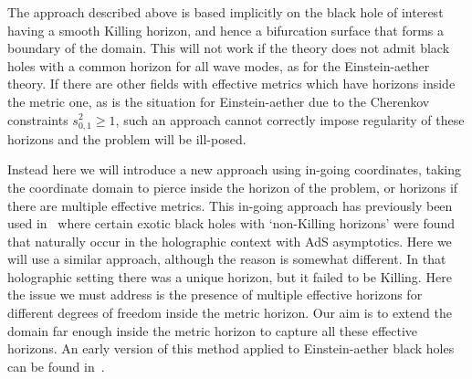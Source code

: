 \documentclass[12pt]{article}
\numberwithin{equation}{section}
\begin{document}
 The approach described above is based  implicitly on the black hole of interest having a smooth Killing horizon, and hence a bifurcation surface that forms a boundary of the domain.
This will not work if the theory does not admit black holes with a common horizon for all wave modes, as for the Einstein-aether theory. If there are other fields with effective metrics which have horizons inside the metric one, as is the situation for Einstein-aether due to the Cherenkov constraints $s_{0,1}^2 \ge 1$, such an approach cannot correctly impose regularity of these horizons and the problem will be ill-posed.

Instead here we will introduce a new approach using in-going coordinates,
taking the coordinate domain to pierce inside the horizon of the problem, or horizons if there are multiple effective metrics.
This in-going approach has previously been used in~\cite{Figueras:2012rb,Sonner:2017jcf} where certain exotic black holes with `non-Killing horizons' were found that naturally occur in the holographic context with AdS asymptotics. Here we will use a similar approach, although the reason is somewhat different. In that holographic setting there was a unique horizon, but it failed to be Killing. Here the issue we must address is the presence of multiple effective horizons for different degrees of freedom inside the metric horizon. Our aim is to extend the domain far enough inside the metric horizon to capture all these effective horizons.
An early version of this method applied to Einstein-aether black holes can be found in~\cite{Adam:2013aa}.
\end{document}
